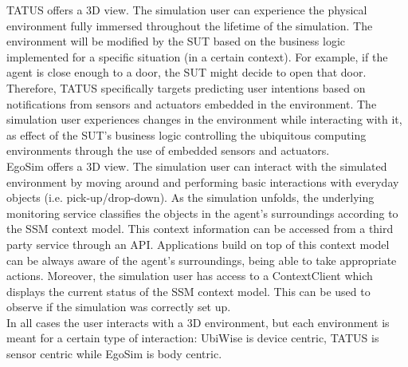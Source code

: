 TATUS offers a 3D view. The simulation user can experience the physical environment fully immersed throughout the lifetime of the simulation. The environment will be modified by the SUT based on the business logic implemented for a specific situation (in a certain context). For example, if the agent is close enough to a door, the SUT might decide to open that door. Therefore, TATUS specifically targets predicting user intentions based on notifications from sensors and actuators embedded in the environment. The simulation user experiences changes in the environment while interacting with it, as effect of the SUT's business logic controlling the ubiquitous computing environments through the use of embedded sensors and actuators.\\

EgoSim offers a 3D view. The simulation user can interact with the simulated environment by moving around and performing basic interactions with everyday objects (i.e. pick-up/drop-down). As the simulation unfolds, the underlying monitoring service classifies the objects in the agent's surroundings according to the SSM context model. This context information can be accessed from a third party service through an API. Applications build on top of this context model can be always aware of the agent's surroundings, being able to take appropriate actions. Moreover, the simulation user has access to a ContextClient which displays the current status of the SSM context model. This can be used to observe if the simulation was correctly set up.\\

In all cases the user interacts with a 3D environment, but each environment is meant for a certain type of interaction: UbiWise is device centric, TATUS is sensor centric while EgoSim is body centric.

